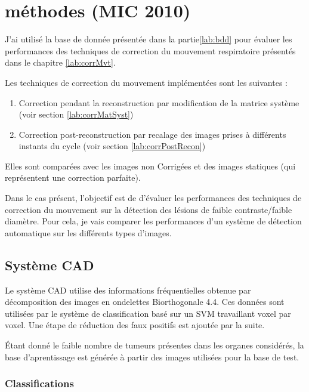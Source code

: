 \chapter{méthodes (MIC 2010)}

J'ai utilisé la base de donnée présentée dans la partie\ref{lab:bdd} pour évaluer les performances des techniques de correction du mouvement respiratoire présentés dans le chapitre \ref{lab:corrMvt}. 

Les techniques de correction du mouvement implémentées sont les suivantes :

\begin{enumerate}
 \item Correction pendant la reconstruction par modification de la matrice système (voir section \ref{lab:corrMatSyst})
 \item Correction post-reconstruction par recalage des images prises à différents instants du cycle (voir section \ref{lab:corrPostRecon})
\end{enumerate}

Elles sont comparées avec les images non Corrigées et des images statiques (qui représentent une correction parfaite).

Dans le cas présent, l'objectif est de d'évaluer les performances des techniques de correction du mouvement sur la détection des lésions de faible contraste/faible diamètre. Pour cela, je vais comparer les performances d'un système de détection automatique sur les différents types d'images.

\section{Système CAD}

Le système CAD utilise des informations fréquentielles obtenue par décomposition des images en ondelettes Biorthogonale 4.4. Ces données sont utilisées par le système de classification basé sur un SVM travaillant voxel par voxel. Une étape de réduction des faux positifs est ajoutée par la suite.

\'Etant donné le faible nombre de tumeurs présentes dans les organes considérés, la base d'aprentissage est générée à partir des images utilisées pour la base de test. 

\subsection{Classifications}

